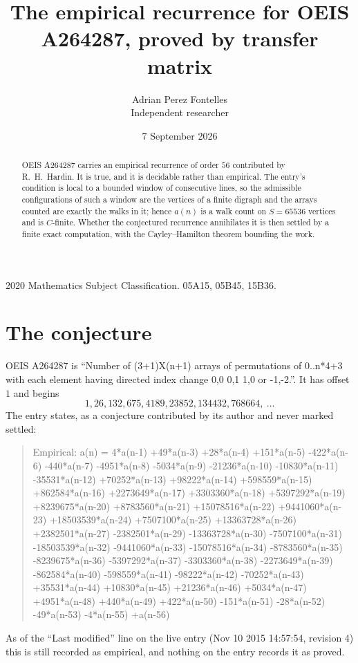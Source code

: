 \documentclass[11pt,a4paper]{article}
\title{The empirical recurrence for OEIS A264287, proved by transfer matrix}
\author{Adrian Perez Fontelles\\ \small Independent researcher}
\date{7 September 2026}
\theoremstyle{plain}
\theoremstyle{definition}
\begin{document}
\maketitle

\begin{abstract}
OEIS A264287 carries an empirical recurrence of order $56$ contributed by R.~H.~Hardin. It is
true, and it is decidable rather than empirical. The entry's condition is local to a bounded window of consecutive lines, so
the admissible configurations of such a window are the vertices of a finite digraph and the
arrays counted are exactly the walks in it; hence $a(n)$ is a walk count on $S=65536$ vertices
and is $C$-finite. Whether the conjectured recurrence annihilates it is then settled by a
finite exact computation, with the Cayley--Hamilton theorem bounding the work.
\end{abstract}

\noindent\small 2020 Mathematics Subject Classification. 05A15, 05B45, 15B36.\normalsize

\section{The conjecture}

OEIS A264287 is ``Number of (3+1)X(n+1) arrays of permutations of 0..n*4+3 with each element having directed index change 0,0 0,1 1,0 or -1,-2.''. It has offset $1$ and begins
\[
1, 26, 132, 675, 4189, 23852, 134432, 768664,\ \dots
\]
The entry states, as a conjecture contributed by its author and never marked settled:
\begin{quote}
Empirical: a(n) = 4*a(n-1) +49*a(n-3) +28*a(n-4) +151*a(n-5) -422*a(n-6) -440*a(n-7) -4951*a(n-8) -5034*a(n-9) -21236*a(n-10) -10830*a(n-11) -35531*a(n-12) +70252*a(n-13) +98222*a(n-14) +598559*a(n-15) +862584*a(n-16) +2273649*a(n-17) +3303360*a(n-18) +5397292*a(n-19) +8239675*a(n-20) +8783560*a(n-21) +15078516*a(n-22) +9441060*a(n-23) +18503539*a(n-24) +7507100*a(n-25) +13363728*a(n-26) +2382501*a(n-27) -2382501*a(n-29) -13363728*a(n-30) -7507100*a(n-31) -18503539*a(n-32) -9441060*a(n-33) -15078516*a(n-34) -8783560*a(n-35) -8239675*a(n-36) -5397292*a(n-37) -3303360*a(n-38) -2273649*a(n-39) -862584*a(n-40) -598559*a(n-41) -98222*a(n-42) -70252*a(n-43) +35531*a(n-44) +10830*a(n-45) +21236*a(n-46) +5034*a(n-47) +4951*a(n-48) +440*a(n-49) +422*a(n-50) -151*a(n-51) -28*a(n-52) -49*a(n-53) -4*a(n-55) +a(n-56)
\end{quote}
As of the ``Last modified'' line on the live entry (Nov 10 2015 14:57:54, revision 4) this is still
recorded as empirical, and nothing on the entry records it as proved.
\end{document}
